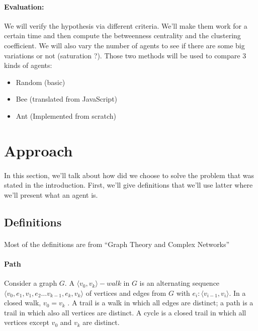\documentclass{article}
\newenvironment{itemh}[0]{\begin{itemize}[font=\color{mygray} \small]}{\end{itemize}}
\begin{document}
	\paragraph{Evaluation:}
		We will verify the hypothesis via different criteria.
		We'll make them work for a certain time and then compute the betweenness centrality and the clustering coefficient.
		We will also vary the number of agents to see if there are some big variations or not (saturation ?).
		Those two methods will be used to compare 3 kinds of agents:
	\begin{itemh}
		\item Random (basic)
		\item Bee (translated from JavaScript)
		\item Ant (Implemented from scratch)
	\end{itemh}

\newpage
\section{Approach}
	\paragraph{}
		In this section, we'll talk about how did we choose to solve the problem that was stated in the introduction.
		First, we'll give definitions that we'll use latter where we'll present what an agent is.
	\subsection{Definitions}
		\paragraph{}
			Most of the definitions are from ``Graph Theory and Complex Networks''\cite{Steen10}
		\paragraph{Path}
			Consider a graph $G$.
			A $\langle v_0 , v_k\rangle-walk$ in $G$ is an alternating sequence $\langle v_0 , e_1 , v_1 , e_2 \dots
			v_{k-1} , e_k , v_k \rangle$ of vertices
			and edges from $G$ with $e_i : \langle v_{i-1},v_i \rangle$.
			In a closed walk, $v_0 = v_k$ .
			A trail is a walk in which all edges are distinct; a path is a trail in which also all vertices are distinct.
			A cycle is a closed trail in which all vertices except $v_0$ and $v_k$ are distinct.
\end{document}
